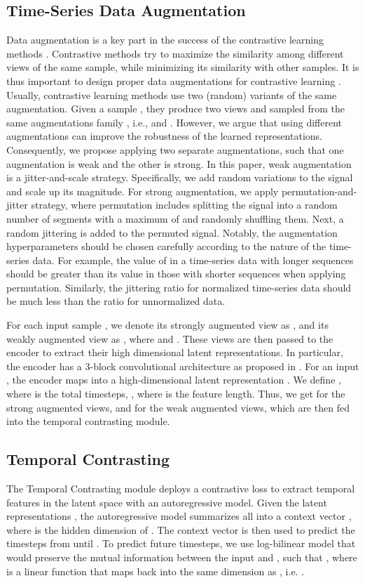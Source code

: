 \documentclass{article}
\begin{document}
\subsection{Time-Series Data Augmentation}
Data augmentation is a key part in the success of the contrastive learning methods \cite{chen2020simple,grill2020bootstrap}. Contrastive methods try to maximize the similarity among different views of the same sample, while minimizing its similarity with other samples. It is thus important to design proper data augmentations for contrastive learning \cite{chen2020simple,mohsenvand20a}. Usually, contrastive learning methods use two (random) variants of the same augmentation. Given a sample , they produce two views  and  sampled from the same augmentations family , i.e.,   and . However, we argue that using different augmentations can improve the robustness of the learned representations. Consequently, we propose applying two separate augmentations, such that one augmentation is weak and the other is strong. In this paper, weak augmentation is a jitter-and-scale strategy. Specifically, we add random variations to the signal and scale up its magnitude. For strong augmentation, we apply permutation-and-jitter strategy, where permutation includes splitting the signal into a random number of segments with a maximum of  and randomly shuffling them. Next, a random jittering is added to the permuted signal.
Notably, the augmentation hyperparameters should be chosen carefully according to the nature of the time-series data. For example, the value of  in a time-series data with longer sequences should be greater than its value in those with shorter sequences when applying permutation. Similarly, the jittering ratio for normalized time-series data should be much less than the ratio for unnormalized data.

For each input sample , we denote its strongly augmented view as , and its weakly augmented view as , where  and .
These views are then passed to the encoder to extract their high dimensional latent representations. In particular, the encoder has a 3-block convolutional architecture as proposed in \cite{wang2017time}. For an input , the encoder maps  into a high-dimensional latent representation .
We define , where  is the total timesteps, , where  is the feature length.
Thus, we get  for the strong augmented views, and  for the weak augmented views, which are then fed into the temporal contrasting module.

\subsection{Temporal Contrasting}
The Temporal Contrasting module deploys a contrastive loss to extract temporal features in the latent space with an autoregressive model.
Given the latent representations , the autoregressive model  summarizes all  into a context vector , where  is the hidden dimension of .
The context vector  is then used to predict the timesteps from  until  . To predict future timesteps, we use log-bilinear model that would preserve the mutual information between the input  and , such that , where  is a linear function that maps  back into the same dimension as , i.e. .
\end{document}
